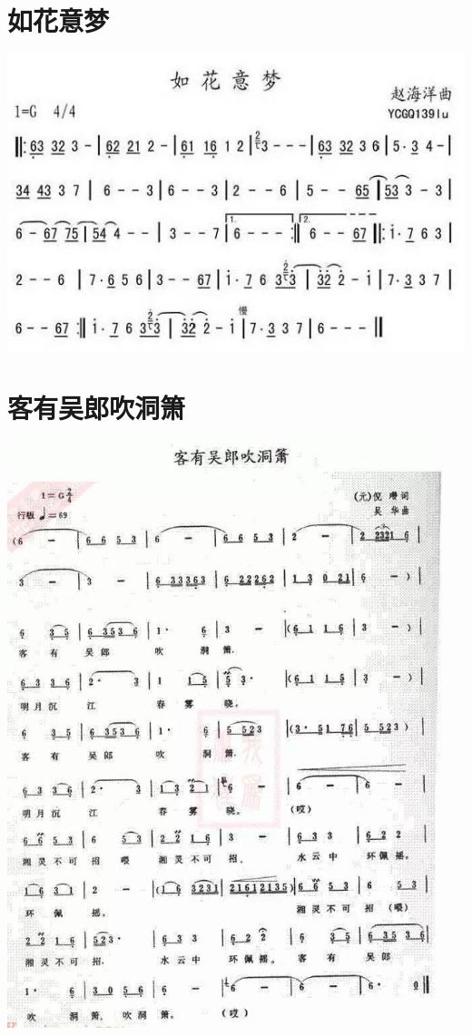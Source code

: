 \documentclass[cn,pad,twocol]{elegantbook}
\begin{document}
\section{如花意梦}\includegraphics[width=\textwidth]{dongxiao/20200819/如花意梦.jpeg}
\section{客有吴郎吹洞箫}\includegraphics[width=0.95\textwidth]{dongxiao/20200819/客有吴郎吹洞箫.jpeg}
\end{document}
